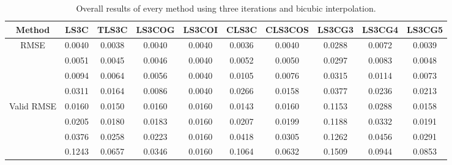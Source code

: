 \begin{table}[ht!]
\centering
\begin{tabular}{c|c|c|c|c|c|c|c|c|c}
Method & \scriptsize{LS3C} & \scriptsize{TLS3C} & \scriptsize{LS3COG} & \scriptsize{LS3COI} & \scriptsize{CLS3C} & \scriptsize{CLS3COS} & \scriptsize{LS3CG3} & \scriptsize{LS3CG4} & \scriptsize{LS3CG5}\\ \hline 
\multirow{4}{*}{RMSE} & 0.0040 & 0.0038 & 0.0040 & 0.0040 & 0.0036 & 0.0040 & 0.0288 & 0.0072 & 0.0039 \\ 
 & 0.0051 & 0.0045 & 0.0046 & 0.0040 & 0.0052 & 0.0050 & 0.0297 & 0.0083 & 0.0048 \\ 
 & 0.0094 & 0.0064 & 0.0056 & 0.0040 & 0.0105 & 0.0076 & 0.0315 & 0.0114 & 0.0073 \\ 
 & 0.0311 & 0.0164 & 0.0086 & 0.0040 & 0.0266 & 0.0158 & 0.0377 & 0.0236 & 0.0213 \\ 
 \hline
\multirow{4}{*}{Valid RMSE} & 0.0160 & 0.0150 & 0.0160 & 0.0160 & 0.0143 & 0.0160 & 0.1153 & 0.0288 & 0.0158 \\ 
 & 0.0205 & 0.0180 & 0.0183 & 0.0160 & 0.0207 & 0.0199 & 0.1188 & 0.0332 & 0.0191 \\ 
 & 0.0376 & 0.0258 & 0.0223 & 0.0160 & 0.0418 & 0.0305 & 0.1262 & 0.0456 & 0.0291 \\ 
 & 0.1243 & 0.0657 & 0.0346 & 0.0160 & 0.1064 & 0.0632 & 0.1509 & 0.0944 & 0.0853 \\ 
 \hline 
\end{tabular}
\caption{Overall results of every method using three  iterations and bicubic interpolation.}
\label{tab:3itC}
\end{table}


